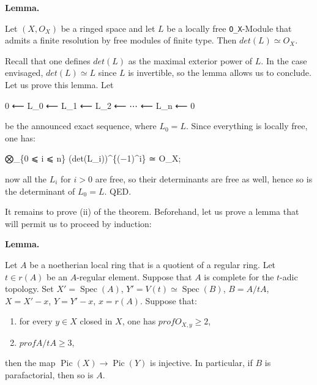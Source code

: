 \documentclass[
  11pt,
  a4paper,
]{book}
\newenvironment{Shaded}{}{}
\newcommand{\NormalTok}[1]{#1}
\providecommand{\tightlist}{%
  \setlength{\itemsep}{0pt}\setlength{\parskip}{0pt}}
\begin{document}
\textbf{Lemma.}

Let \((X, O_{X})\) be a ringed space and let \(L\) be a locally free
\texttt{O\_X}-Module that admits a finite resolution by free modules of
finite type. Then \(det(L) \simeq O_{X}\).

Recall that one defines \(det(L)\) as the maximal exterior power of
\(L\). In the case envisaged, \(det(L) \simeq L\) since \(L\) is
invertible, so the lemma allows us to conclude. Let us prove this lemma.
Let

\begin{Shaded}
\begin{Highlighting}[]
\NormalTok{0 ⟵ L\_0 ⟵ L\_1 ⟵ L\_2 ⟵ ⋯ ⟵ L\_n ⟵ 0}
\end{Highlighting}
\end{Shaded}

be the announced exact sequence, where \(L_{0} = L\). Since everything
is locally free, one has:

\begin{Shaded}
\begin{Highlighting}[]
\NormalTok{⨂\_\{0 ⩽ i ⩽ n\} (det(L\_i))\^{}\{(−1)\^{}i\} ≃ O\_X;}
\end{Highlighting}
\end{Shaded}

now all the \(L_{i}\) for \(i > 0\) are free, so their determinants are
free as well, hence so is the determinant of \(L_{0}
= L\). QED.

It remains to prove (ii) of the theorem. Beforehand, let us prove a
lemma that will permit us to proceed by induction:

\textbf{Lemma.}

Let \(A\) be a noetherian local ring that is a quotient of a regular
ring. Let \(t \in r(A)\) be an \(A\)-regular element. Suppose that \(A\)
is complete for the \(t\)-adic topology. Set
\(X' = \operatorname{Spec}(A)\), \(Y' = V(t) \simeq
\operatorname{Spec}(B)\), \(B = A/tA\), \(X = X' - {x}\),
\(Y = Y' - {x}\), \(x = r(A)\). Suppose that:

\begin{enumerate}
\def\labelenumi{\arabic{enumi}.}
\tightlist
\item
  for every \(y \in X\) closed in \(X\), one has
  \(prof O_{X,y} \geqslant 2\),
\item
  \(prof A/tA \geqslant 3\),
\end{enumerate}

then the map \(\operatorname{Pic}(X) \to \operatorname{Pic}(Y)\) is
injective. In particular, if \(B\) is parafactorial, then so is \(A\).
\end{document}
